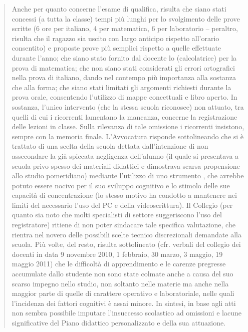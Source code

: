 \begin{quote}
\begin{description}
Anche per quanto concerne l'esame di qualifica, risulta che siano stati concessi (a tutta la classe) tempi più lunghi per lo svolgimento delle prove scritte (6 ore per italiano, 4 per matematica, 6 per laboratorio – peraltro, risulta che il ragazzo sia uscito con largo anticipo rispetto all'orario consentito) e proposte prove più semplici rispetto a quelle effettuate durante l'anno; che siano stato fornito dal docente lo  (calcolatrice) per la prova di matematica; che non siano stati considerati gli errori ortografici nella prova di italiano, dando nel contempo più importanza alla sostanza che alla forma; che siano stati limitati gli argomenti richiesti durante la prova orale, consentendo l'utilizzo di mappe concettuali e libro aperto.
In sostanza, l'unico intervento (che la stessa scuola riconosce) non attuato, tra quelli di cui i ricorrenti lamentano la mancanza, concerne la registrazione delle lezioni in classe. Sulla rilevanza di tale omissione i ricorrenti insistono, sempre con la memoria finale.
L'Avvocatura risponde sottolineando che si è trattato di una scelta della scuola dettata dall'intenzione di non assecondare la già spiccata negligenza dell'alunno (il quale si presentava a scuola privo spesso dei materiali didattici e dimostrava scarsa propensione allo studio pomeridiano) mediante l'utilizzo di uno strumento , che avrebbe potuto essere nocivo per il suo sviluppo cognitivo e lo stimolo delle sue capacità di concentrazione (lo stesso motivo ha condotto a mantenere nei limiti del necessario l'uso del PC e della videoscrittura).
Il Collegio (per quanto sia noto che molti specialisti di settore suggeriscono l'uso del registratore) ritiene di non poter sindacare tale specifica valutazione, che rientra nel novero delle possibili scelte tecnico discrezionali demandate alla scuola.
Più volte, del resto, risulta sottolineato (cfr. verbali del collegio dei docenti in data 9 novembre 2010, 1 febbraio, 30 marzo, 3 maggio, 19 maggio 2011) che le difficoltà di apprendimento e le carenze pregresse accumulate dallo studente non sono state colmate anche a causa del suo scarso impegno nello studio, non soltanto nelle materie  ma anche nella maggior parte di quelle di carattere operativo e laboratoriale, nelle quali l'incidenza dei fattori cognitivi è assai minore.
In sintesi, in base agli atti non sembra possibile imputare l'insuccesso scolastico ad omissioni e lacune significative del Piano didattico personalizzato e della sua attuazione.

\end{description}
\end{quote}
